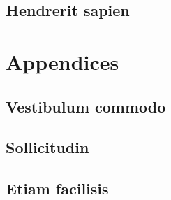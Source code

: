 \chapter{Hendrerit sapien} \label{ch:hendrerit}

\newpage


\part{Appendices}
\newpage
\chapter{Vestibulum commodo} \label{ch:commodo}

\newpage
\chapter{Sollicitudin} \label{ch:sollicitudin}

\newpage
\chapter{Etiam facilisis} \label{ch:etiam}

\newpage
\listoffigures
\listoftables


